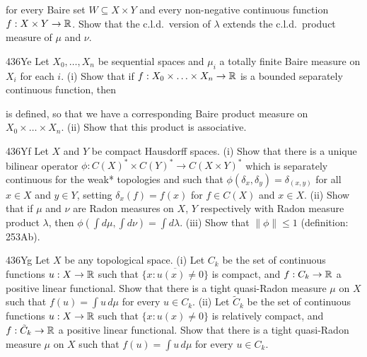 { 
      
\noindent for every Baire set $W\subseteq X\times Y$ and every 
non-negative continuous function $f:X\times Y\to\Bbb R$.   Show that the 
c.l.d.\ version of $\lambda$ extends the c.l.d.\ product measure of 
$\mu$ and $\nu$. 
      
\spheader 436Ye Let $X_0,\ldots,X_n$ be sequential spaces and $\mu_i$ a 
totally finite Baire measure on $X_i$ for each $i$.   (i) Show that if 
$f:X_0\times\ldots\times X_n\to\Bbb R$ is a bounded separately 
continuous function, then 
      
      
\noindent is defined, so that we have a corresponding Baire product 
measure on $X_0\times\ldots\times X_n$.   (ii) Show that this product is 
associative. 
      
\spheader 436Yf Let $X$ and $Y$ be compact Hausdorff spaces.   (i) Show 
that there is a unique bilinear operator 
$\phi:C(X)^*\times C(Y)^*\to C(X\times Y)^*$ which is separately 
continuous for the weak* topologies and such that 
$\phi(\delta_x,\delta_y)=\delta_{(x,y)}$ for all $x\in X$ and $y\in Y$, 
setting $\delta_x(f)=f(x)$ for $f\in C(X)$ and $x\in X$.   (ii) Show 
that if $\mu$ and $\nu$ are Radon measures on $X$, $Y$ respectively with 
Radon measure product $\lambda$, then 
$\phi(\int d\mu,\int d\nu)=\int d\lambda$.   (iii) Show that 
$\|\phi\|\le 1$ (definition:  253Ab). 
 
\spheader 436Yg Let $X$ be any topological space.   (i) Let $C_k$ be the 
set of continuous functions $u:X\to\Bbb R$ such that 
$\overline{\{x:u(x)\ne 0\}}$ is compact, and $f:C_k\to\Bbb R$ a positive 
linear functional.   Show that there is a tight quasi-Radon measure $\mu$  
on $X$ such that $f(u)=\int u\,d\mu$ for every $u\in C_k$. 
(ii) Let $\tilde C_k$ be the 
set of continuous functions $u:X\to\Bbb R$ such that 
$\{x:u(x)\ne 0\}$ is relatively compact, and $f:\tilde C_k\to\Bbb R$ a  
positive 
linear functional.   Show that there is a tight quasi-Radon measure $\mu$  
on $X$ such that $f(u)=\int u\,d\mu$ for every $u\in C_k$. 
}%
      
